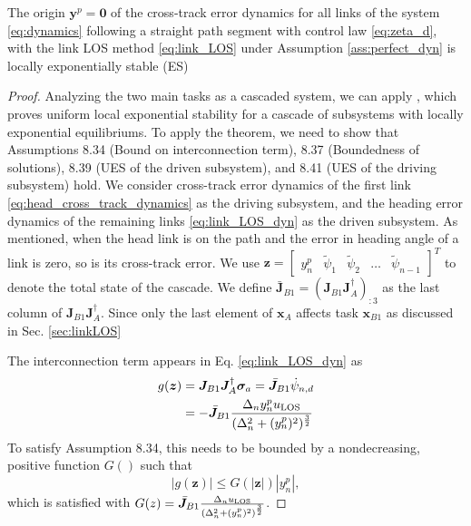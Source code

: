 \documentclass[../main.tex]{subfiles}
\begin{document}
\begin{theorem}
    \label{thm:task_b1}
    The origin $\bm{y}^p = \bm{0}$ of the cross-track error dynamics for all links of the system \eqref{eq:dynamics} following a straight path segment with control law \eqref{eq:zeta_d}, with the link LOS method \eqref{eq:link_LOS} under Assumption \ref{ass:perfect_dyn} is locally exponentially stable (ES)
\end{theorem}
\begin{proof}
    Analyzing the two main tasks as a cascaded system, we can apply \cite[Theorem 8.42]{chaillet2006}, which proves uniform local exponential stability for a cascade of subsystems with locally exponential equilibriums. To apply the theorem, we need to show that Assumptions 8.34 (Bound on interconnection term), 8.37 (Boundedness of solutions), 8.39 (UES of the driven subsystem), and 8.41 (UES of the driving subsystem) hold. We consider cross-track error dynamics of the first link \eqref{eq:head_cross_track_dynamics} as the driving subsystem, and the heading error dynamics of the remaining links \eqref{eq:link_LOS_dyn} as the driven subsystem. As mentioned, when the head link is on the path and the error in heading angle  of a link is zero, so is its cross-track error. We use $\bm{z} = \begin{bmatrix} y^p_n & \tilde{\psi}_1 & \tilde{\psi}_2 & \dots & \tilde{\psi}_{n-1} \end{bmatrix}^T$ to denote the total state of the cascade. We define $\bar{\bm{J}}_{B1} = (\bm{J}_{B1} \bm{J}_A^{\dagger})_{:3}$ as the last column of $\bm{J}_{B1} \bm{J}_A^{\dagger}$. Since only the last element of $\bm{x}_A$ affects task $\bm{x}_{B1}$ as discussed in Sec. \ref{sec:linkLOS}

    The interconnection term appears in Eq. \eqref{eq:link_LOS_dyn} as
    \begin{align}
        \label{eq:interconnection_b1}
        g(\bm{z}) &= \bm{J}_{B1} \bm{J}_A^{\dagger}\bm{\sigma}_a
        = \bar{\bm{J}}_{B1} \dot{\psi}_{n, d} \\
        &= - \bar{\bm{J}}_{B1} \frac{\Delta_n y^p_n u_{\rm LOS}}{(\Delta_n^2 + (y^p_n)^2)^{\frac{3}{2}}}
    \end{align}
    To satisfy Assumption 8.34, this needs to be bounded by a nondecreasing, positive function $G()$ such that
    \begin{equation}
        |g(\bm{z})| \leq G(|\bm{z}|) |y^p_n|,
    \end{equation}
    which is satisfied with $G(z) = \bar{\bm{J}}_{B1} \frac{\Delta_n u_{\rm LOS}}{(\Delta_n^2 + (y^p_n)^2)^{\frac{3}{2}}}$.


\end{proof}
\end{document}

